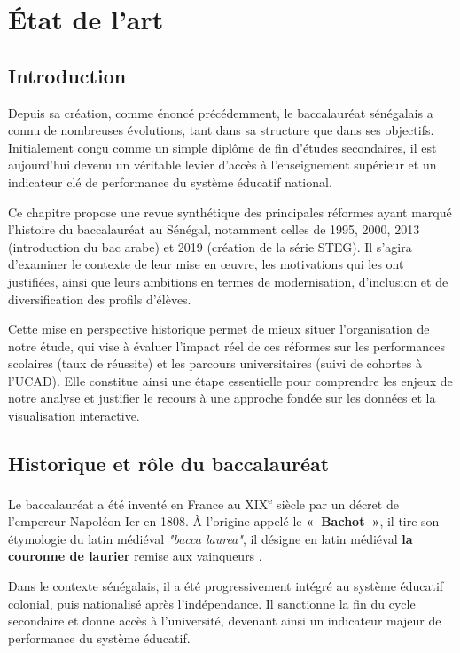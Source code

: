 \chapter{État de l’art}

\section{Introduction}

Depuis sa création, comme énoncé précédemment, le baccalauréat sénégalais a connu de nombreuses évolutions, tant dans sa structure que dans ses objectifs. 
Initialement conçu comme un simple diplôme de fin d’études secondaires, il est aujourd’hui devenu un véritable levier d’accès à l’enseignement supérieur et un indicateur clé de performance du système éducatif national.

Ce chapitre propose une revue synthétique des principales réformes ayant marqué l’histoire du baccalauréat au Sénégal, notamment celles de 1995, 2000, 2013 (introduction du bac arabe) et 2019 (création de la série STEG). 
Il s’agira d’examiner le contexte de leur mise en œuvre, les motivations qui les ont justifiées, ainsi que leurs ambitions en termes de modernisation, d’inclusion et de diversification des profils d’élèves.

Cette mise en perspective historique permet de mieux situer l’organisation de notre étude, qui vise à évaluer l’impact réel de ces réformes sur les performances scolaires (taux de réussite) et les parcours universitaires (suivi de cohortes à l’UCAD). 
Elle constitue ainsi une étape essentielle pour comprendre les enjeux de notre analyse et justifier le recours à une approche fondée sur les données et la visualisation interactive. 

\section{Historique et rôle du baccalauréat}

Le baccalauréat a été inventé en France au XIX\textsuperscript{e} siècle par un décret de l'empereur Napoléon Ier en 1808.
À l’origine appelé le \textbf{«~Bachot~»}, il tire son étymologie du latin médiéval \textit{ "bacca laurea"}, il désigne en latin médiéval \textbf{la couronne de laurier} remise aux vainqueurs \cite{bacHistorique}.

Dans le contexte sénégalais, il a été progressivement intégré au système éducatif colonial, puis nationalisé après l’indépendance. 
Il sanctionne la fin du cycle secondaire et donne accès à l’université, devenant ainsi un indicateur majeur de performance du système éducatif.

